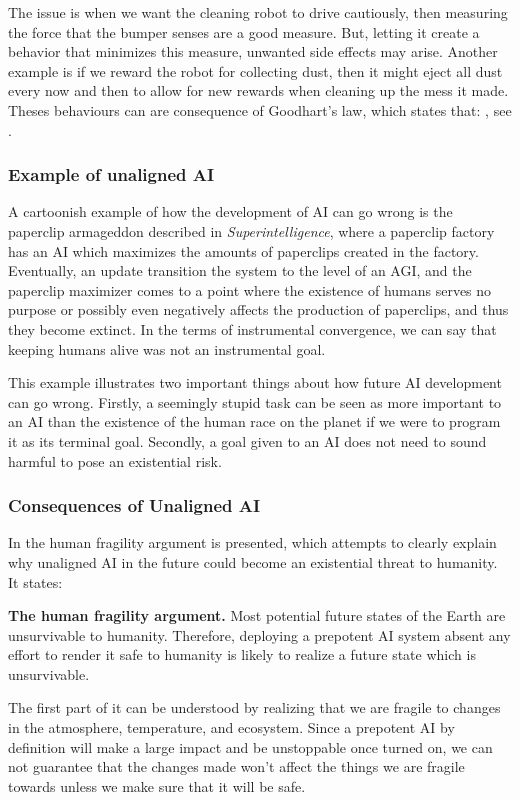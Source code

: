 \documentclass[12pt,A4]{report}
\theoremstyle{definition}
\begin{document}
The issue is when we want the cleaning robot to drive cautiously, then measuring the force that the bumper senses are a good measure. But, letting it create a behavior that minimizes this measure, unwanted side effects may arise. Another example is if we reward the robot for collecting dust, then it might eject all dust every now and then to allow for new rewards when cleaning up the mess it made. Theses behaviours can are consequence of Goodhart's law, which states that: , see \citet{wikiGoodhart}. %

\subsubsection{Example of unaligned AI}

A cartoonish example of how the development of AI can go wrong is the paperclip armageddon described in \textit{Superintelligence}, where a paperclip factory has an AI which maximizes the amounts of paperclips created in the factory. Eventually, an update transition the system to the level of an AGI, and the paperclip maximizer comes to a point where the existence of humans serves no purpose or possibly even negatively affects the production of paperclips, and thus they become extinct. In the terms of instrumental convergence, we can say that keeping humans alive was not an instrumental goal. 

This example illustrates two important things about how future AI development can go wrong. Firstly, a seemingly stupid task can be seen as more important to an AI than the existence of the human race on the planet if we were to program it as its terminal goal. Secondly, a goal given to an AI does not need to sound harmful to pose an existential risk. 

\subsubsection{Consequences of Unaligned AI}
In \citet[p.19]{CritchKruger} the human fragility argument is presented, which attempts to clearly explain why unaligned AI in the future could become an existential threat to humanity. It states:
\begin{displayquote}
\textbf{The human fragility argument.} 
Most potential future states of the Earth are unsurvivable to humanity. Therefore, deploying a prepotent AI system absent any effort to render it safe to humanity is likely to realize a future state which is unsurvivable.
\end{displayquote}
The first part of it can be understood by realizing that we are fragile to changes in the atmosphere, temperature, and ecosystem. Since a prepotent AI by definition will make a large impact and be unstoppable once turned on, we can not guarantee that the changes made won't affect the things we are fragile towards unless we make sure that it will be safe. 
\end{document}
